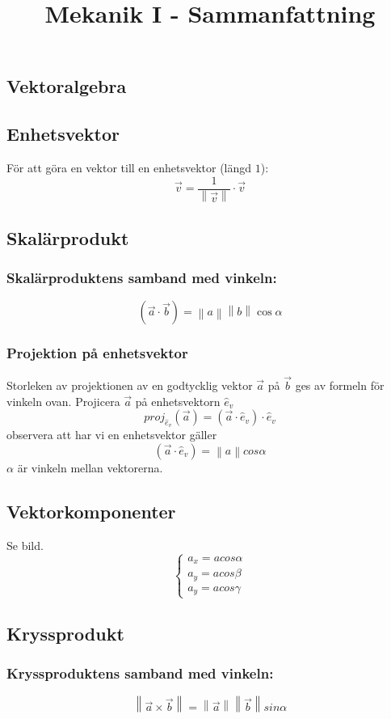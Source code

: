 \documentclass{article}
\title{Mekanik I - Sammanfattning}
\date{}
\newcommand{\midtitle}[1]{
\begin{center}
\Huge{\text{#1}}
\newpage
\end{center}
}
\begin{document}
\midtitle{Statik}
\begin{paracol}{2}
\section{Vektoralgebra}
\subsection{Enhetsvektor}
För att göra en vektor till en enhetsvektor (längd $1$):
$$
\boxed{
\vec v = \frac{1}{\left\| \vec v \right\|} \cdot \vec v
}
$$
\subsection{Skalärprodukt}
\subsubsection{Skalärproduktens samband med vinkeln:}
$$
\boxed{
(\vec a \cdot \vec b)=\left\|a\right\|\left\|b\right\|\cos\alpha
}
$$
\subsubsection{Projektion på enhetsvektor}
Storleken av projektionen av en godtycklig vektor $\vec a$ på $\vec b$ ges av formeln för vinkeln ovan.
Projicera $\vec a$ på enhetsvektorn $\hat e_v$ 
$$
proj_{\hat e_v}(\vec a)=(\vec a \cdot \hat e_v)\cdot \hat e_v
$$
observera att har vi en enhetsvektor gäller
$$
(\vec a \cdot \hat e_v)=\left\|a\right\|cos\alpha
$$
$\alpha$ är vinkeln mellan vektorerna.

\subsection{Vektorkomponenter}
Se bild.
$$
\begin{cases}
a_x = acos\alpha\\
a_y = acos\beta\\
a_y = acos\gamma
\end{cases}
$$
\subsection{Kryssprodukt}
\subsubsection{Kryssproduktens samband med vinkeln:}
$$
\boxed{
\left\|\vec a \times \vec b \right\|=\left\|\vec a \right\|\left\|\vec b \right\|sin\alpha
}
$$


\end{paracol}
\end{document}
